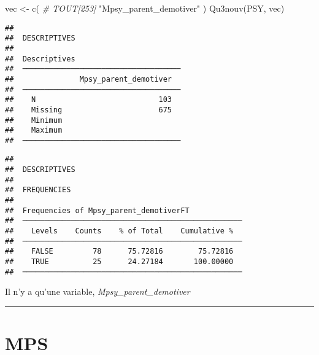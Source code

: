 \documentclass[
]{article}
\newenvironment{Shaded}{\begin{snugshade}}{\end{snugshade}}
\newcommand{\CommentTok}[1]{\textcolor[rgb]{0.56,0.35,0.01}{\textit{#1}}}
\newcommand{\FunctionTok}[1]{\textcolor[rgb]{0.00,0.00,0.00}{#1}}
\newcommand{\NormalTok}[1]{#1}
\newcommand{\OtherTok}[1]{\textcolor[rgb]{0.56,0.35,0.01}{#1}}
\newcommand{\StringTok}[1]{\textcolor[rgb]{0.31,0.60,0.02}{#1}}
\begin{document}
\begin{Shaded}
\begin{Highlighting}[]
\NormalTok{vec }\OtherTok{\textless{}{-}} \FunctionTok{c}\NormalTok{(          }\CommentTok{\# TOUT[253]}
  \StringTok{"Mpsy\_parent\_demotiver"}
\NormalTok{)}
\FunctionTok{Qu3nouv}\NormalTok{(PSY, vec)}
\end{Highlighting}
\end{Shaded}

\begin{verbatim}
## 
##  DESCRIPTIVES
## 
##  Descriptives                         
##  ──────────────────────────────────── 
##               Mpsy_parent_demotiver   
##  ──────────────────────────────────── 
##    N                            103   
##    Missing                      675   
##    Minimum                            
##    Maximum                            
##  ────────────────────────────────────
\end{verbatim}

\begin{verbatim}
## 
##  DESCRIPTIVES
## 
##  FREQUENCIES
## 
##  Frequencies of Mpsy_parent_demotiverFT             
##  ────────────────────────────────────────────────── 
##    Levels    Counts    % of Total    Cumulative %   
##  ────────────────────────────────────────────────── 
##    FALSE         78      75.72816        75.72816   
##    TRUE          25      24.27184       100.00000   
##  ──────────────────────────────────────────────────
\end{verbatim}

Il n'y a qu'une variable, \emph{Mpsy\_parent\_demotiver}

\begin{center}\rule{0.5\linewidth}{0.5pt}\end{center}

\hypertarget{mps}{%
\section{MPS}\label{mps}}
\end{document}
